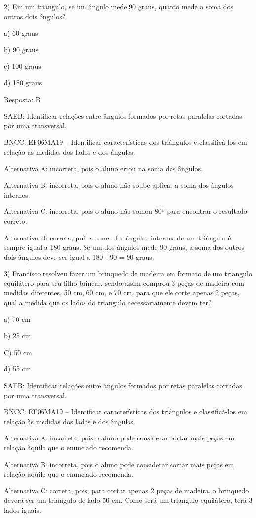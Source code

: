 2) Em um triângulo, se um ângulo mede 90 graus, quanto mede a soma dos
outros dois ângulos?

a) 60 graus

b) 90 graus

c) 100 graus

d) 180 graus

Resposta: B

SAEB: Identificar relações entre ângulos formados por retas paralelas
cortadas por uma transversal.

BNCC: EF06MA19 -- Identificar características dos triângulos e
classificá-los em relação às medidas dos lados e dos ângulos.

Alternativa A: incorreta, pois o aluno errou na soma dos ângulos.

Alternativa B: incorreta, pois o aluno não soube aplicar a soma dos
ângulos internos.

Alternativa C: incorreta, pois o aluno não somou 80º para encontrar o
resultado correto.

Alternativa D: correta, pois a soma dos ângulos internos de um triângulo
é sempre igual a 180 graus. Se um dos ângulos mede 90 graus, a soma dos
outros dois ângulos deve ser igual a 180 - 90 = 90 graus.

3) Francisco resolveu fazer um brinquedo de madeira em formato de um
triangulo equilátero para seu filho brincar, sendo assim comprou 3 peças
de madeira com medidas diferentes, 50 cm, 60 cm, e 70 cm, para que ele
corte apenas 2 peças, qual a medida que os lados do triangulo
necessariamente devem ter?

a) 70 cm

b) 25 cm

C) 50 cm

d) 55 cm

SAEB: Identificar relações entre ângulos formados por retas paralelas
cortadas por uma transversal.

BNCC: EF06MA19 -- Identificar características dos triângulos e
classificá-los em relação às medidas dos lados e dos ângulos.

Alternativa A: incorreta, pois o aluno pode considerar cortar mais peças
em relação àquilo que o enunciado recomenda.

Alternativa B: incorreta, pois o aluno pode considerar cortar mais peças
em relação àquilo que o enunciado recomenda.

Alternativa C: correta, pois, para cortar apenas 2 peças de madeira, o
brinquedo deverá ser um triangulo de lado 50 cm. Como será um triangulo
equilátero, terá 3 lados iguais.

